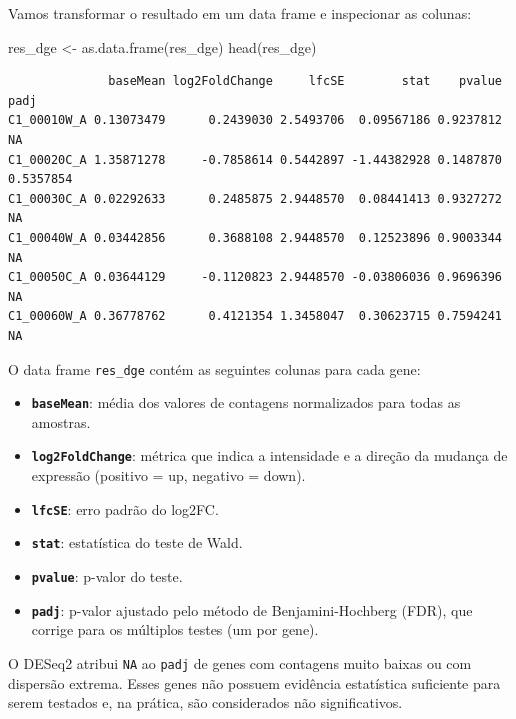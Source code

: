 \documentclass[
  letterpaper,
  DIV=11,
  numbers=noendperiod]{scrreprt}
\newenvironment{Shaded}{\begin{snugshade}}{\end{snugshade}}
\newcommand{\FunctionTok}[1]{\textcolor[rgb]{0.28,0.35,0.67}{#1}}
\newcommand{\NormalTok}[1]{\textcolor[rgb]{0.00,0.23,0.31}{#1}}
\newcommand{\OtherTok}[1]{\textcolor[rgb]{0.00,0.23,0.31}{#1}}
\providecommand{\tightlist}{%
  \setlength{\itemsep}{0pt}\setlength{\parskip}{0pt}}
\begin{document}
Vamos transformar o resultado em um data frame e inspecionar as colunas:

\begin{Shaded}
\begin{Highlighting}[]
\NormalTok{res\_dge }\OtherTok{\textless{}{-}} \FunctionTok{as.data.frame}\NormalTok{(res\_dge)}
\FunctionTok{head}\NormalTok{(res\_dge)}
\end{Highlighting}
\end{Shaded}

\begin{verbatim}
              baseMean log2FoldChange     lfcSE        stat    pvalue      padj
C1_00010W_A 0.13073479      0.2439030 2.5493706  0.09567186 0.9237812        NA
C1_00020C_A 1.35871278     -0.7858614 0.5442897 -1.44382928 0.1487870 0.5357854
C1_00030C_A 0.02292633      0.2485875 2.9448570  0.08441413 0.9327272        NA
C1_00040W_A 0.03442856      0.3688108 2.9448570  0.12523896 0.9003344        NA
C1_00050C_A 0.03644129     -0.1120823 2.9448570 -0.03806036 0.9696396        NA
C1_00060W_A 0.36778762      0.4121354 1.3458047  0.30623715 0.7594241        NA
\end{verbatim}

O data frame \texttt{res\_dge} contém as seguintes colunas para cada
gene:

\begin{itemize}
\tightlist
\item
  \textbf{\texttt{baseMean}}: média dos valores de contagens
  normalizados para todas as amostras.
\item
  \textbf{\texttt{log2FoldChange}}: métrica que indica a intensidade e a
  direção da mudança de expressão (positivo = up, negativo = down).
\item
  \textbf{\texttt{lfcSE}}: erro padrão do log2FC.
\item
  \textbf{\texttt{stat}}: estatística do teste de Wald.
\item
  \textbf{\texttt{pvalue}}: p-valor do teste.
\item
  \textbf{\texttt{padj}}: p-valor ajustado pelo método de
  Benjamini-Hochberg (FDR), que corrige para os múltiplos testes (um por
  gene).
\end{itemize}

\begin{tcolorbox}[enhanced jigsaw, arc=.35mm, bottomrule=.15mm, bottomtitle=1mm, breakable, colback=white, colbacktitle=quarto-callout-note-color!10!white, colframe=quarto-callout-note-color-frame, coltitle=black, left=2mm, leftrule=.75mm, opacityback=0, opacitybacktitle=0.6, rightrule=.15mm, title=\textcolor{quarto-callout-note-color}{\faInfo}\hspace{0.5em}{Ponto Importante}, titlerule=0mm, toprule=.15mm, toptitle=1mm]

O DESeq2 atribui \texttt{NA} ao \texttt{padj} de genes com contagens
muito baixas ou com dispersão extrema. Esses genes não possuem evidência
estatística suficiente para serem testados e, na prática, são
considerados não significativos.

\end{tcolorbox}
\end{document}
